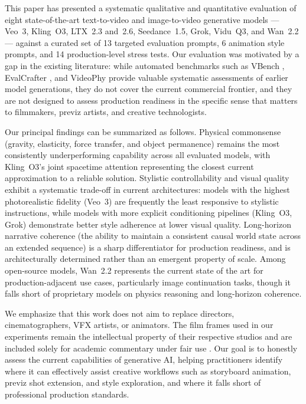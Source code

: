 \documentclass[sigconf]{acmart}
\begin{document}
This paper has presented a systematic qualitative and quantitative
evaluation of eight state-of-the-art text-to-video and image-to-video
generative models — Veo~3, Kling~O3, LTX~2.3 and~2.6, Seedance~1.5,
Grok, Vidu~Q3, and Wan~2.2 — against a curated set of 13 targeted
evaluation prompts, 6 animation style prompts, and 14 production-level
stress tests. Our evaluation was motivated by a gap in the existing
literature: while automated benchmarks such as VBench
\cite{huang2024vbench}, EvalCrafter \cite{liu2024evalcrafter}, and
VideoPhy \cite{bansal2024videophy} provide valuable systematic
assessments of earlier model generations, they do not cover the
current commercial frontier, and they are not designed to assess
production readiness in the specific sense that matters to
filmmakers, previz artists, and creative technologists.

Our principal findings can be summarized as follows. Physical
commonsense (gravity, elasticity, force transfer, and object
permanence) remains the most consistently underperforming
capability across all evaluated models, with Kling~O3's joint
spacetime attention representing the closest current approximation
to a reliable solution. Stylistic controllability and visual
quality exhibit a systematic trade-off in current architectures:
models with the highest photorealistic fidelity (Veo~3) are
frequently the least responsive to stylistic instructions, while
models with more explicit conditioning pipelines (Kling~O3, Grok)
demonstrate better style adherence at lower visual quality.
Long-horizon narrative coherence (the ability to maintain a
consistent causal world state across an extended sequence) is
a sharp differentiator for production readiness, and is
architecturally determined rather than an emergent property
of scale. Among open-source models, Wan~2.2 represents the
current state of the art for production-adjacent use cases,
particularly image continuation tasks, though it falls short
of proprietary models on physics reasoning and long-horizon
coherence.

We emphasize that this work does not aim to replace directors, cinematographers, VFX artists, or animators. The film frames used in our experiments remain the intellectual property of their respective studios and are included solely for academic commentary under fair use \cite{usc2011fairuse}. Our goal is to honestly assess the current capabilities of generative AI, helping practitioners identify where it can effectively assist creative workflows such as storyboard animation, previz shot extension, and style exploration, and where it falls short of professional production standards.
\end{document}
